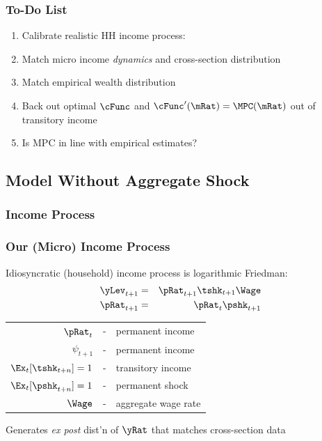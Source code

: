 \documentclass{beamer}
\newcommand{\jemph}[1]{{\color{jirkasred}#1}}
\begin{document}
\begin{frame}
\frametitle{{To-Do List}}


\begin{enumerate}
\item Calibrate realistic HH income process:
\bi
\item Match micro income {\it dynamics} and cross-section distribution
\ei 
\item Match empirical wealth distribution
\item Back out optimal $\cFunc$ and $\cFunc^{\prime}(\mRat)=\MPC(\mRat)$ out of transitory income
\item Is MPC in line with empirical estimates?
\end{enumerate}


\end{frame}


\subsection{Model Without Aggregate Shock}

\subsubsection{Income Process}
\begin{frame}
\frametitle{{Our (Micro) Income Process}}

Idiosyncratic (household) income process is logarithmic Friedman:
  \begin{eqnarray*}
\yLev_{t+1}&=&\pRat_{t+1}\tshk_{t+1}\Wage\\
\pRat_{t+1}&=&\pRat_{t}\pshk_{t+1}
\end{eqnarray*}
\begin{center}
\begin{tabular}{rcl}
$\pRat_{t}$ & - & permanent income\\
$\psi_{t+1}$ & - & permanent income\\
$\Ex_{t}[\tshk_{t+n}]=1$ & - & transitory income\\
$\Ex_{t}[\pshk_{t+n}]=1$ & - & permanent shock\\
$\Wage$ & - & aggregate wage rate
\end{tabular}
\end{center}

Generates {\it ex post} dist'n of $\yRat$ that matches cross-section data

\end{frame}
\end{document}
